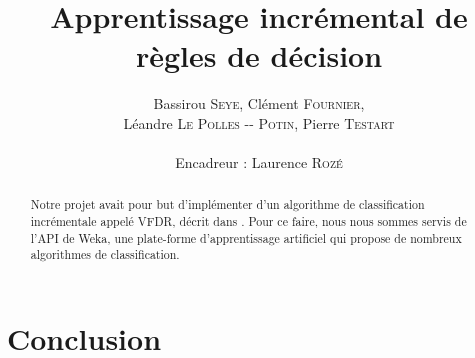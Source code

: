 \documentclass[a4paper,11pt]{article}
\title{ \textbf{Apprentissage incrémental de règles de décision} }
\author{Bassirou \textsc{Seye}, Clément \textsc{Fournier}, \\
        Léandre \textsc{Le Polles -{}- Potin}, Pierre \textsc{Testart} \\
        \\
        Encadreur : Laurence \textsc{Rozé}}
\date{}                    %
\begin{document}
          

    \maketitle                 %
    \thispagestyle{empty}      %

    \begin{abstract}
        Notre projet avait pour but d'implémenter d'un algorithme de classification incrémentale appelé VFDR, décrit dans \cite{Gama-VFDR}. Pour ce faire, nous nous sommes servis de l’API de Weka, une plate-forme d'apprentissage artificiel qui propose de nombreux algorithmes de classification. 

    \end{abstract} 

    
    
    
        

    \section{Conclusion} 

    \nocite{*}
    
\end{document}
